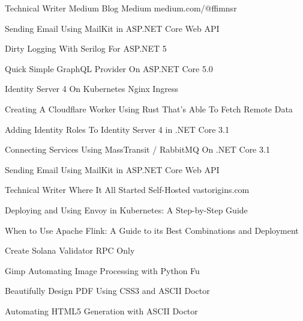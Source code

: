 
\begin{cventries}
    \cventry
        {Technical Writer}
        {Medium Blog}
        {Medium}
        {medium.com/@ffimnsr}
        {
            \begin{cvitems}
                \item {Sending Email Using MailKit in ASP.NET Core Web API}
                \item {Dirty Logging With Serilog For ASP.NET 5}
                \item {Quick Simple GraphQL Provider On ASP.NET Core 5.0}
                \item {Identity Server 4 On Kubernetes Nginx Ingress}
                \item {Creating A Cloudflare Worker Using Rust That’s Able To Fetch Remote Data}
                \item {Adding Identity Roles To Identity Server 4 in .NET Core 3.1}
                \item {Connecting Services Using MassTransit / RabbitMQ On .NET Core 3.1}
                \item {Sending Email Using MailKit in ASP.NET Core Web API}
            \end{cvitems}
        }

    \cventry
        {Technical Writer}
        {Where It All Started}
        {Self-Hosted}
        {vastorigins.com} 
        {
            \begin{cvitems} %
                \item {Deploying and Using Envoy in Kubernetes: A Step-by-Step Guide}
                \item {When to Use Apache Flink: A Guide to its Best Combinations and Deployment}
                \item {Create Solana Validator RPC Only}
                \item {Gimp Automating Image Processing with Python Fu}
                \item {Beautifully Design PDF Using CSS3 and ASCII Doctor}
                \item {Automating HTML5 Generation with ASCII Doctor}
            \end{cvitems}
        }

\end{cventries}